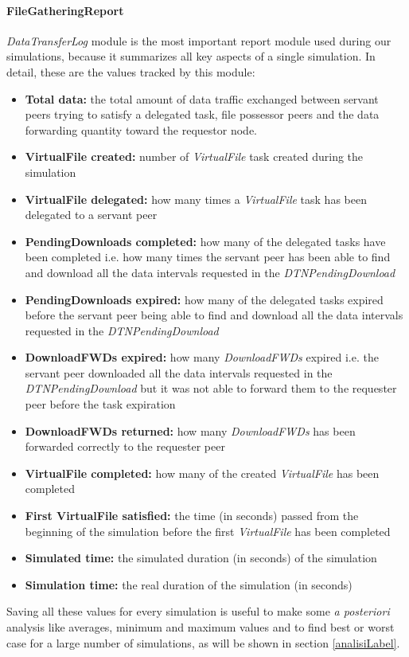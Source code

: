 \paragraph{FileGatheringReport}
\textit{DataTransferLog} module is the most important report module used during our simulations, because it summarizes all key aspects of a single simulation. In detail, these are the values tracked by this module:
\begin{itemize}
\item \textbf{Total data:}	the total amount of data traffic exchanged between servant peers trying to satisfy a delegated task, file possessor peers and the data forwarding quantity toward the requestor node.
\item \textbf{VirtualFile created:}	number of \textit{VirtualFile} task created during the simulation
\item \textbf{VirtualFile delegated:} how many times a \textit{VirtualFile} task has been delegated to a servant peer
\item \textbf{PendingDownloads completed:} how many of the delegated tasks have been completed i.e. how many times the servant peer has been able to find and download all the data intervals requested in the \textit{DTNPendingDownload} 
\item \textbf{PendingDownloads expired:} how many of the delegated tasks expired before the servant peer being able to find and download all the data intervals requested in the \textit{DTNPendingDownload} 
\item \textbf{DownloadFWDs expired:} how many \textit{DownloadFWDs} expired i.e. the servant peer downloaded all the data intervals requested in the \textit{DTNPendingDownload} but it was not able to forward them to the requester peer before the task expiration
\item \textbf{DownloadFWDs returned:} how many \textit{DownloadFWDs} has been forwarded correctly to the requester peer
\item \textbf{VirtualFile completed:} how many of the created \textit{VirtualFile} has been completed
\item \textbf{First VirtualFile satisfied:}	the time (in seconds) passed from the beginning of the simulation before the first \textit{VirtualFile} has been completed
\item \textbf{Simulated time:} the simulated duration (in seconds) of the simulation
\item \textbf{Simulation time:}	the real duration of the simulation (in seconds)
\end{itemize}
Saving all these values for every simulation is useful to make some \textit{a posteriori} analysis like averages, minimum and maximum values and to find best or worst case for a large number of simulations, as will be shown in section \ref{analisiLabel}.


